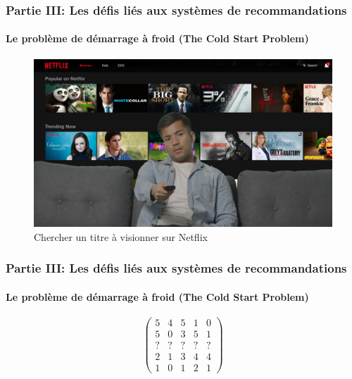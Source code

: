
\begin{frame}

    \frametitle{Partie III: Les défis liés aux systèmes de recommandations}
    \framesubtitle{Le problème de démarrage à froid (The Cold Start Problem)}

    \begin{figure}
        \centering
        \includegraphics[totalheight=5.5cm]{Images/PartieIII/GuyBrowsingNetflix.png}
        \caption{Chercher un titre à visionner sur Netflix}
    \end{figure}

\end{frame}

\begin{frame}

    \frametitle{Partie III: Les défis liés aux systèmes de recommandations}
    \framesubtitle{Le problème de démarrage à froid (The Cold Start Problem)}

    \begin{figure}
        \[
            \begin{pmatrix}
                5 & 4 & 5 & 1 & 0 \\
                5 & 0 & 3 & 5 & 1 \\
                ? & ? & ? & ? & ? \\
                2 & 1 & 3 & 4 & 4 \\
                1 & 0 & 1 & 2 & 1
            \end{pmatrix}
        \]

    \end{figure}

\end{frame}

